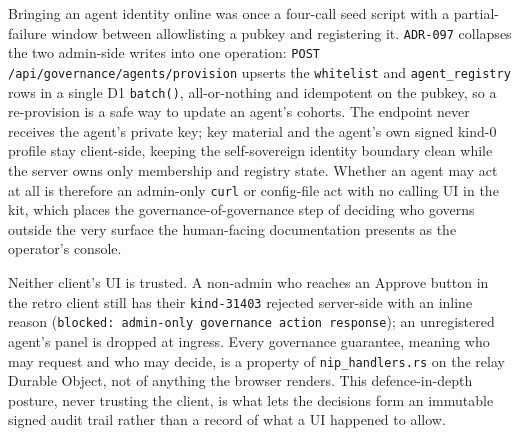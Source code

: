 Bringing an agent identity online was once a four-call seed script with a partial-failure window between allowlisting a pubkey and registering it. \texttt{ADR-097} collapses the two admin-side writes into one operation: \texttt{POST /api/governance/agents/provision} upserts the \texttt{whitelist} and \texttt{agent\_registry} rows in a single D1 \texttt{batch()}, all-or-nothing and idempotent on the pubkey, so a re-provision is a safe way to update an agent's cohorts. The endpoint never receives the agent's private key; key material and the agent's own signed kind-0 profile stay client-side, keeping the self-sovereign identity boundary clean while the server owns only membership and registry state. Whether an agent may act at all is therefore an admin-only \texttt{curl} or config-file act with no calling UI in the kit, which places the governance-of-governance step of deciding who governs outside the very surface the human-facing documentation presents as the operator's console.

\begin{keyinsight}[title={The relay is the sole enforcement point}]
Neither client's UI is trusted. A non-admin who reaches an Approve button in the retro client still has their \texttt{kind-31403} rejected server-side with an inline reason (\texttt{blocked: admin-only governance action response}); an unregistered agent's panel is dropped at ingress. Every governance guarantee, meaning who may request and who may decide, is a property of \texttt{nip\_handlers.rs} on the relay Durable Object, not of anything the browser renders. This defence-in-depth posture, never trusting the client, is what lets the decisions form an immutable signed audit trail rather than a record of what a UI happened to allow.
\end{keyinsight}

